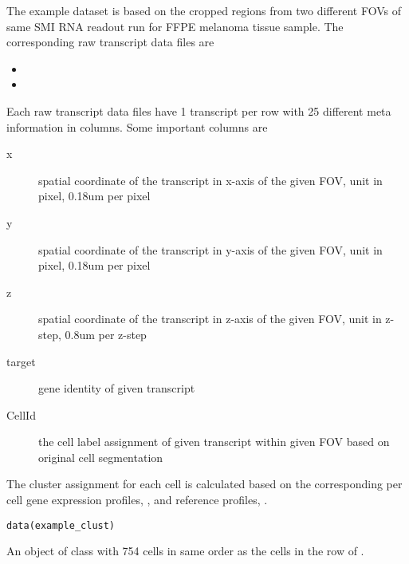 \documentclass[letterpaper]{book}
\begin{document}
%
\begin{Description}
The example dataset is based on the cropped regions from two different FOVs of same SMI RNA readout run for FFPE melanoma tissue sample.
The corresponding raw transcript data files are
\begin{itemize}

\item{} 
\item{} 

\end{itemize}

Each raw transcript data files have 1 transcript per row with 25 different meta information in columns. Some important columns are
\begin{description}

\item[x] spatial coordinate of the transcript in x-axis of the given FOV, unit in pixel, 0.18um per pixel
\item[y] spatial coordinate of the transcript in y-axis of the given FOV, unit in pixel, 0.18um per pixel
\item[z] spatial coordinate of the transcript in z-axis of the given FOV, unit in z-step, 0.8um per z-step
\item[target] gene identity of given transcript
\item[CellId] the cell label assignment of given transcript within given FOV based on original cell segmentation

\end{description}

The cluster assignment for each cell is calculated based on the corresponding per cell gene expression profiles, , and reference profiles, .
\end{Description}
%
\begin{Usage}
\begin{verbatim}
data(example_clust)
\end{verbatim}
\end{Usage}
%
\begin{Format}
An object of class  with 754 cells in same order as the cells in the row of .
\end{Format}
\end{document}
